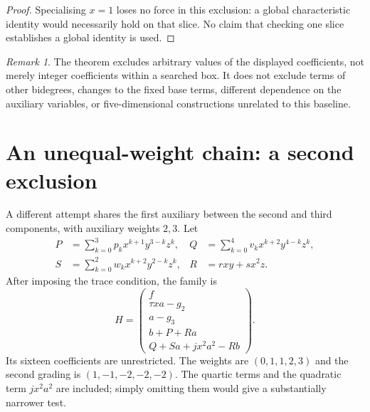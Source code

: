 \documentclass[11pt,a4paper]{article}
\theoremstyle{remark}\newtheorem{remark}[theorem]{Remark}
\begin{document}
\begin{proof}
Specialising $x=1$ loses no force in this exclusion: a global characteristic
identity would necessarily hold on that slice. No claim that checking one slice
establishes a global identity is used.
\end{proof}

\begin{remark}
The theorem excludes arbitrary values of the displayed coefficients, not merely
integer coefficients within a searched box. It does not exclude terms of other
bidegrees, changes to the fixed base terms, different dependence on the auxiliary
variables, or five-dimensional constructions unrelated to this baseline.
\end{remark}

\section{An unequal-weight chain: a second exclusion}\label{chainsection}
A different attempt shares the first auxiliary between the second and third
components, with auxiliary weights $2,3$. Let
\begin{align}
P&=\sum_{k=0}^3p_k x^{k+1}y^{3-k}z^k, &
Q&=\sum_{k=0}^4v_k x^{k+2}y^{4-k}z^k,\\
S&=\sum_{k=0}^2w_k x^{k+2}y^{2-k}z^k, &
R&=rxy+sx^2z.
\end{align}
After imposing the trace condition, the family is
\begin{equation}\label{chainfamily}
H=\begin{pmatrix}
f\\ \tau xa-g_2\\a-g_3\\b+P+Ra\\Q+Sa+jx^2a^2-Rb
\end{pmatrix}.
\end{equation}
Its sixteen coefficients are unrestricted. The weights are
$(0,1,1,2,3)$ and the second grading is $(1,-1,-2,-2,-2)$.
The quartic terms and the quadratic term $jx^2a^2$ are included; simply omitting
them would give a substantially narrower test.
\end{document}
